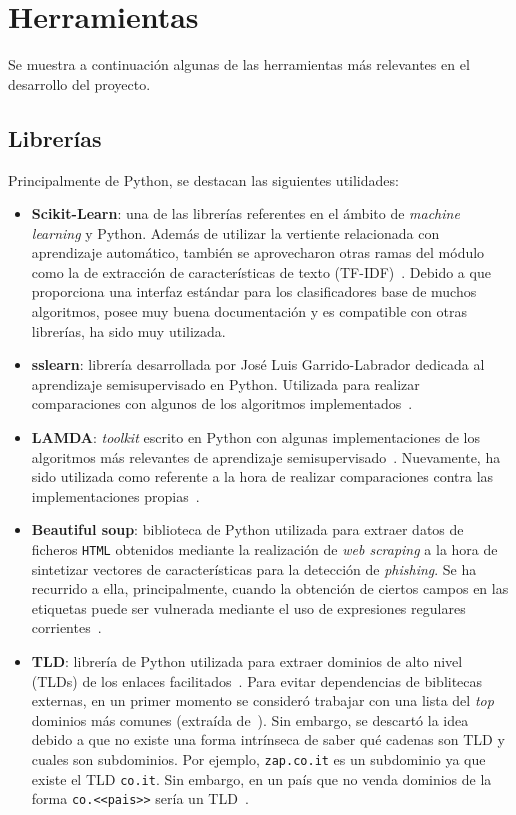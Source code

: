 \section{Herramientas}

Se muestra a continuación algunas de las herramientas más relevantes en el desarrollo del proyecto.

\subsection{Librerías}

Principalmente de Python, se destacan las siguientes utilidades:

\begin{itemize}
	\item \textbf{Scikit-Learn}: una de las librerías referentes en el ámbito de \textit{machine learning} y Python. Además de utilizar la vertiente relacionada con aprendizaje automático, también se aprovecharon otras ramas del módulo como la de extracción de características de texto (TF-IDF)~\cite{sslearnRepo}. Debido a que proporciona una interfaz estándar para los clasificadores base de muchos algoritmos, posee muy buena documentación y es compatible con otras librerías, ha sido muy utilizada.
	
	\item \textbf{sslearn}: librería desarrollada por José Luis Garrido-Labrador dedicada al aprendizaje semisupervisado en Python. Utilizada para realizar comparaciones con algunos de los algoritmos implementados~\cite{sslearnRepo}.
	
	\item \textbf{LAMDA}: \textit{toolkit} escrito en Python con algunas implementaciones de los algoritmos más relevantes de aprendizaje semisupervisado~\cite{lamdasslRepo}. Nuevamente, ha sido utilizada como referente a la hora de realizar comparaciones contra las implementaciones propias~\cite{lamdasslPaper}.
	
	\item \textbf{Beautiful soup}: biblioteca de Python utilizada para extraer datos de ficheros \texttt{HTML} obtenidos mediante la realización de \textit{web scraping} a la hora de sintetizar vectores de características para la detección de \textit{phishing}. Se ha recurrido a ella, principalmente, cuando la obtención de ciertos campos en las etiquetas puede ser vulnerada mediante el uso de expresiones regulares corrientes~\cite{bs4Docs}.
	
	\item \textbf{TLD}: librería de Python utilizada para extraer dominios de alto nivel (TLDs) de los enlaces facilitados~\cite{tldLibreria}. Para evitar dependencias de biblitecas externas, en un primer momento se consideró trabajar con una lista del \textit{top} dominios más comunes (extraída de~\cite{tldLista}). Sin embargo, se descartó la idea debido a que no existe una forma intrínseca de saber qué cadenas son TLD y cuales son subdominios. Por ejemplo, \texttt{zap.co.it} es un subdominio ya que existe el TLD \texttt{co.it}. Sin embargo, en un país que no venda dominios de la forma \texttt{co.<<pais>>} sería un TLD~\cite{tldNogenerico}.
	

\end{itemize}
